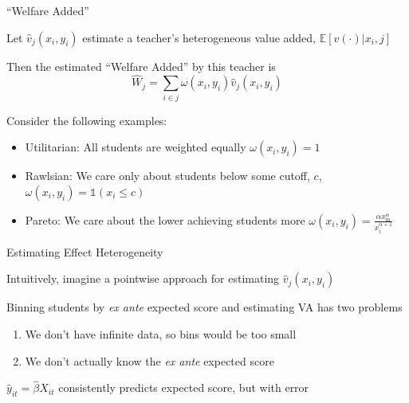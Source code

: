 \documentclass[11pt]{beamer}
\newenvironment{wideitemize}{\itemize\addtolength{\itemsep}{14pt}}{\enditemize}
\begin{document}
\begin{frame}{``Welfare Added''}

\begin{wideitemize}
    \item Let $\hat{v}_j(x_i,y_i)$ estimate a teacher's heterogeneous value added, $\mathbb{E}[v(\cdot)|x_i,j]$
    
    \item Then the estimated ``Welfare Added'' by this teacher is  
    \[
    \hat{W}_j  = \sum_{i\in j} \omega(x_i,y_i) \hat{v}_j(x_i,y_i) 
    \] 
    
    \item Consider the following examples:
    \begin{itemize}
        \item Utilitarian: All students are weighted equally $\omega(x_i,y_i) = 1$
        \item Rawlsian: We care only about students below some cutoff, $c$, $\omega(x_i,y_i) = \mathds{1}(x_i\leq c)$
        \item Pareto: We care about the lower achieving students more $ \omega(x_i,y_i)=  \frac{\alpha x_\mathrm{m}^\alpha}{x_i^{\alpha+1}}$ 
    \end{itemize}
    
\end{wideitemize}


\end{frame}



\begin{frame}{Estimating Effect Heterogeneity}

\begin{wideitemize}
    \item Intuitively, imagine a pointwise approach for estimating $\hat{v}_j(x_i,y_i)$
    
    \item Binning students by \textit{ex ante} expected score and estimating VA has two problems
    \begin{enumerate}
        \item We don't have infinite data, so bins would be too small
        \item We don't actually know the \textit{ex ante} expected score
    \end{enumerate}

    \item $\hat{y}_{it} = \hat{\beta} X_{it} $ consistently predicts expected score, but with error

\end{wideitemize}

\end{frame}
\end{document}
